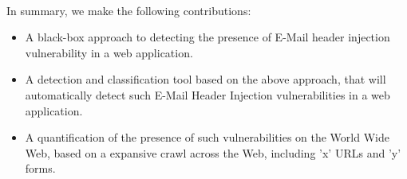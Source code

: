 \paragraph{} %
In summary, we make the following contributions:
\begin{itemize}
	
	\item{A black-box approach to detecting the presence of E-Mail header injection vulnerability in a web application.}
	
	\item{A detection and classification tool based on the above approach, that will automatically detect such E-Mail Header Injection vulnerabilities in a web application.}
	
	\item{A quantification of the presence of such vulnerabilities on the World Wide Web, based on a expansive crawl across the Web, including {'x'} URLs and {'y'} forms.}
	
\end{itemize}